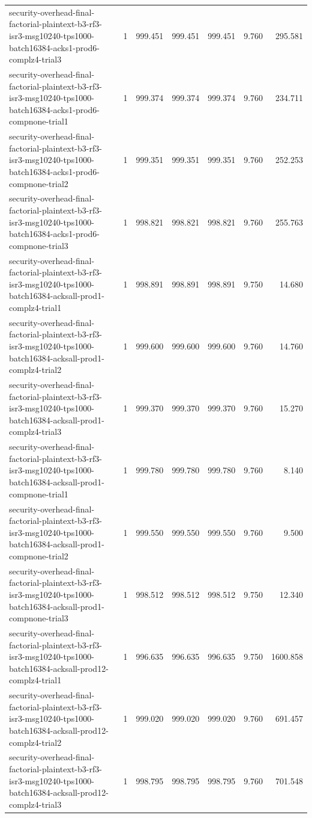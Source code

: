 \begin{tabular}{lrrrrrr}
security-overhead-final-factorial-plaintext-b3-rf3-isr3-msg10240-tps1000-batch16384-acks1-prod6-complz4-trial3 & 1 & 999.451 & 999.451 & 999.451 & 9.760 & 295.581 \\
security-overhead-final-factorial-plaintext-b3-rf3-isr3-msg10240-tps1000-batch16384-acks1-prod6-compnone-trial1 & 1 & 999.374 & 999.374 & 999.374 & 9.760 & 234.711 \\
security-overhead-final-factorial-plaintext-b3-rf3-isr3-msg10240-tps1000-batch16384-acks1-prod6-compnone-trial2 & 1 & 999.351 & 999.351 & 999.351 & 9.760 & 252.253 \\
security-overhead-final-factorial-plaintext-b3-rf3-isr3-msg10240-tps1000-batch16384-acks1-prod6-compnone-trial3 & 1 & 998.821 & 998.821 & 998.821 & 9.760 & 255.763 \\
security-overhead-final-factorial-plaintext-b3-rf3-isr3-msg10240-tps1000-batch16384-acksall-prod1-complz4-trial1 & 1 & 998.891 & 998.891 & 998.891 & 9.750 & 14.680 \\
security-overhead-final-factorial-plaintext-b3-rf3-isr3-msg10240-tps1000-batch16384-acksall-prod1-complz4-trial2 & 1 & 999.600 & 999.600 & 999.600 & 9.760 & 14.760 \\
security-overhead-final-factorial-plaintext-b3-rf3-isr3-msg10240-tps1000-batch16384-acksall-prod1-complz4-trial3 & 1 & 999.370 & 999.370 & 999.370 & 9.760 & 15.270 \\
security-overhead-final-factorial-plaintext-b3-rf3-isr3-msg10240-tps1000-batch16384-acksall-prod1-compnone-trial1 & 1 & 999.780 & 999.780 & 999.780 & 9.760 & 8.140 \\
security-overhead-final-factorial-plaintext-b3-rf3-isr3-msg10240-tps1000-batch16384-acksall-prod1-compnone-trial2 & 1 & 999.550 & 999.550 & 999.550 & 9.760 & 9.500 \\
security-overhead-final-factorial-plaintext-b3-rf3-isr3-msg10240-tps1000-batch16384-acksall-prod1-compnone-trial3 & 1 & 998.512 & 998.512 & 998.512 & 9.750 & 12.340 \\
security-overhead-final-factorial-plaintext-b3-rf3-isr3-msg10240-tps1000-batch16384-acksall-prod12-complz4-trial1 & 1 & 996.635 & 996.635 & 996.635 & 9.750 & 1600.858 \\
security-overhead-final-factorial-plaintext-b3-rf3-isr3-msg10240-tps1000-batch16384-acksall-prod12-complz4-trial2 & 1 & 999.020 & 999.020 & 999.020 & 9.760 & 691.457 \\
security-overhead-final-factorial-plaintext-b3-rf3-isr3-msg10240-tps1000-batch16384-acksall-prod12-complz4-trial3 & 1 & 998.795 & 998.795 & 998.795 & 9.760 & 701.548 \\

\end{tabular}
